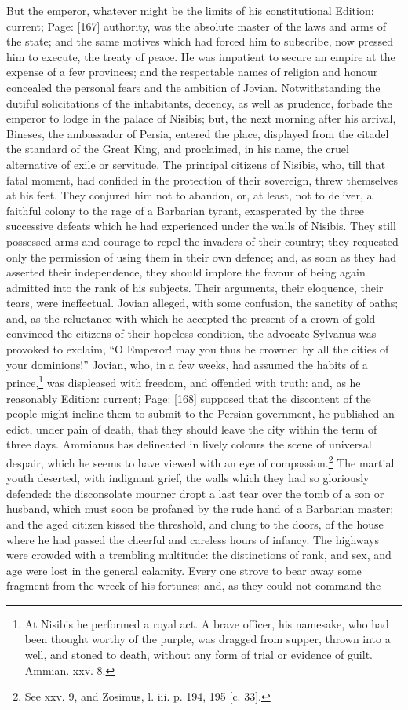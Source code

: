 But the emperor, whatever might be the limits of his constitutional Edition: current; Page: [167] authority, was the absolute master of the laws and arms of the state; and the same motives which had forced him to subscribe, now pressed him to execute, the treaty of peace. He was impatient to secure an empire at the expense of a few provinces; and the respectable names of religion and honour concealed the personal fears and the ambition of Jovian. Notwithstanding the dutiful solicitations of the inhabitants, decency, as well as prudence, forbade the emperor to lodge in the palace of Nisibis; but, the next morning after his arrival, Bineses, the ambassador of Persia, entered the place, displayed from the citadel the standard of the Great King, and proclaimed, in his name, the cruel alternative of exile or servitude. The principal citizens of Nisibis, who, till that fatal moment, had confided in the protection of their sovereign, threw themselves at his feet. They conjured him not to abandon, or, at least, not to deliver, a faithful colony to the rage of a Barbarian tyrant, exasperated by the three successive defeats which he had experienced under the walls of Nisibis. They still possessed arms and courage to repel the invaders of their country; they requested only the permission of using them in their own defence; and, as soon as they had asserted their independence, they should implore the favour of being again admitted into the rank of his subjects. Their arguments, their eloquence, their tears, were ineffectual. Jovian alleged, with some confusion, the sanctity of oaths; and, as the reluctance with which he accepted the present of a crown of gold convinced the citizens of their hopeless condition, the advocate Sylvanus was provoked to exclaim, \texthebrew{“}O Emperor! may you thus be crowned by all the cities of your dominions!\texthebrew{}” Jovian, who, in a few weeks, had assumed the habits of a prince,\footnote{At Nisibis he performed a royal act. A brave officer, his namesake, who had been thought worthy of the purple, was dragged from supper, thrown into a well, and stoned to death, without any form of trial or evidence of guilt. Ammian. xxv. 8.} was displeased with freedom, and offended with truth: and, as he reasonably Edition: current; Page: [168] supposed that the discontent of the people might incline them to submit to the Persian government, he published an edict, under pain of death, that they should leave the city within the term of three days. Ammianus has delineated in lively colours the scene of universal despair, which he seems to have viewed with an eye of compassion.\footnote{See xxv. 9, and Zosimus, l. iii. p. 194, 195 [c. 33].} The martial youth deserted, with indignant grief, the walls which they had so gloriously defended: the disconsolate mourner dropt a last tear over the tomb of a son or husband, which must soon be profaned by the rude hand of a Barbarian master; and the aged citizen kissed the threshold, and clung to the doors, of the house where he had passed the cheerful and careless hours of infancy. The highways were crowded with a trembling multitude: the distinctions of rank, and sex, and age were lost in the general calamity. Every one strove to bear away some fragment from the wreck of his fortunes; and, as they could not command the 